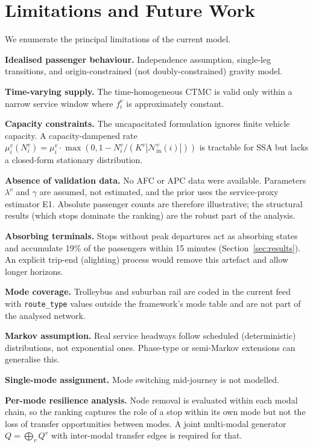 \documentclass[12pt,a4paper]{article}
\theoremstyle{plain}
\theoremstyle{definition}
\theoremstyle{remark}
\begin{document}


\section{Limitations and Future Work}
\label{sec:limitations}

We enumerate the principal limitations of the current model.

\textbf{Idealised passenger behaviour.}  Independence assumption, single-leg
transitions, and origin-constrained (not doubly-constrained) gravity model.

\textbf{Time-varying supply.}  The time-homogeneous CTMC is valid only within
a narrow service window where $f^v_i$ is approximately constant.

\textbf{Capacity constraints.}  The uncapacitated formulation ignores finite
vehicle capacity.  A capacity-dampened rate
$\mu^v_i(N^v_i)=\mu^v_i\cdot\max(0,1-N^v_i/(K^v|\mathcal{N}^v_{\mathrm{in}}(i)|))$
is tractable for SSA but lacks a closed-form stationary distribution.

\textbf{Absence of validation data.}  No AFC or APC data were available.
Parameters $\lambda^v$ and $\gamma$ are assumed, not estimated, and the prior
uses the service-proxy estimator E1.  Absolute passenger counts are therefore
illustrative; the structural results (which stops dominate the ranking) are the
robust part of the analysis.

\textbf{Absorbing terminals.}  Stops without peak departures act as absorbing
states and accumulate 19\% of the passengers within 15 minutes
(Section~\ref{sec:results}).  An explicit trip-end (alighting) process would
remove this artefact and allow longer horizons.

\textbf{Mode coverage.}  Trolleybus and suburban rail are coded in the current
feed with \texttt{route\_type} values outside the framework's mode table and
are not part of the analysed network.

\textbf{Markov assumption.}  Real service headways follow scheduled
(deterministic) distributions, not exponential ones.  Phase-type or
semi-Markov extensions \citep{norris1997} can generalise this.

\textbf{Single-mode assignment.}  Mode switching mid-journey is not modelled.

\textbf{Per-mode resilience analysis.}  Node removal is evaluated within
each modal chain, so the ranking captures the role of a stop within its own
mode but not the loss of transfer opportunities between modes.  A joint
multi-modal generator $Q=\bigoplus_v Q^v$ with inter-modal transfer edges is
required for that.
\end{document}
